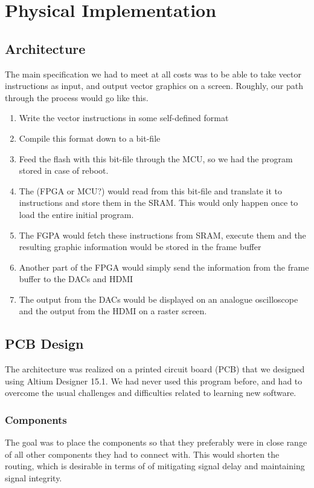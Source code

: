 \chapter{Physical Implementation}


\section{Architecture}
The main specification we had to meet at all costs was to be able to take vector instructions as input, and output vector graphics on a screen. Roughly, our path through the process would go like this. 
\begin{enumerate}
\item Write the vector instructions in some self-defined format
\item Compile this format down to a bit-file
\item Feed the flash with this bit-file through the MCU, so we had the program stored in case of reboot. 
\item The (FPGA or MCU?) would read from this bit-file and translate it to instructions and store them in the SRAM. This would only happen once to load the entire initial program.
\item The FGPA would fetch these instructions from SRAM, execute them and the resulting graphic information would be stored in the frame buffer
\item Another part of the FPGA would simply send the information from the frame buffer to the DACs and HDMI
\item The output from the DACs would be displayed on an analogue oscilloscope and the output from the HDMI on a raster screen.
\end{enumerate}

\section{PCB Design}
The architecture was realized on a printed circuit board (PCB) that we designed using Altium Designer 15.1. We had never used this program before, and had to overcome the usual challenges and difficulties related to learning new software.

\subsection{Components}
The goal was to place the components so that they preferably were in close range of all other components they had to connect with. This would shorten the routing, which is desirable in terms of of mitigating signal delay and maintaining signal integrity.
